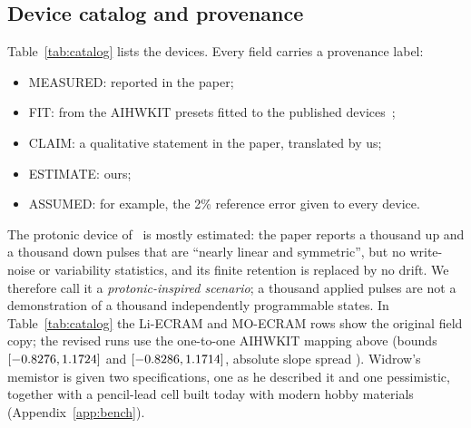 \subsection{Device catalog and provenance}\label{sec:catalog}
Table~\ref{tab:catalog} lists the devices. Every field carries a provenance label:
\begin{itemize}
\item MEASURED: reported in the paper;
\item FIT: from the AIHWKIT presets fitted to the published devices~\cite{rasch2021aihwkit};
\item CLAIM: a qualitative statement in the paper, translated by us;
\item ESTIMATE: ours;
\item ASSUMED: for example, the 2\% reference error given to every device.
\end{itemize}
The protonic device of~\cite{onen2022} is mostly estimated: the paper reports a thousand up and a thousand down pulses that are
``nearly linear and symmetric'', but no write-noise or variability statistics, and its finite retention is replaced by no
drift. We therefore call it a \emph{protonic-inspired scenario}; a thousand applied pulses are not a demonstration of a
thousand independently programmable states. In Table~\ref{tab:catalog} the Li-ECRAM and MO-ECRAM rows show the original field
copy; the revised runs use the one-to-one AIHWKIT mapping above (bounds $[-0.8276, 1.1724]$ and $[-0.8286, 1.1714]$,
absolute slope spread \RVliGammaDtod). Widrow's memistor is given two specifications,
one as he described it and one pessimistic, together with a pencil-lead cell built today with modern hobby materials
(Appendix~\ref{app:bench}).



